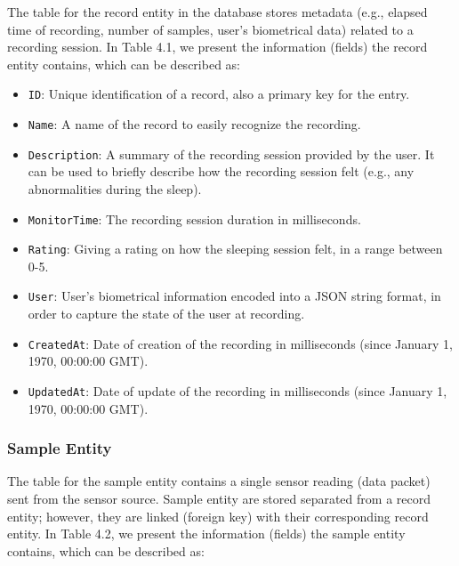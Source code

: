 The table for the record entity in the database stores metadata (e.g., elapsed time of recording, number of samples, user's biometrical data) related to a recording session. In Table 4.1, we present the information (fields) the record entity contains, which can be described as: 
\begin{itemize}
    \item \verb|ID|: Unique identification of a record, also a primary key for the entry.
    \item \verb|Name|: A name of the record to easily recognize the recording.
    \item \verb|Description|: A summary of the recording session provided by the user. It can be used to briefly describe how the recording session felt (e.g., any abnormalities during the sleep).
    \item \verb|MonitorTime|: The recording session duration in milliseconds.
    \item \verb|Rating|: Giving a rating on how the sleeping session felt, in a range between 0-5. 
    \item \verb|User|: User's biometrical information encoded into a JSON string format, in order to capture the state of the user at recording. 
    \item \verb|CreatedAt|: Date of creation of the recording in milliseconds (since January 1, 1970, 00:00:00 GMT).
    \item \verb|UpdatedAt|: Date of update of the recording in milliseconds (since January 1, 1970, 00:00:00 GMT).
\end{itemize}

\begin{table}[!h]
\begin{center}
\caption{Example entry in the record table.}
\end{center}
\end{table}





\subsubsection{Sample Entity} \label{ssec:sample}
The table for the sample entity contains a single sensor reading (data packet) sent from the sensor source. Sample entity are stored separated from a record entity; however, they are linked (foreign key) with their corresponding record entity. In Table 4.2, we present the information (fields) the sample entity contains, which can be described as: 

